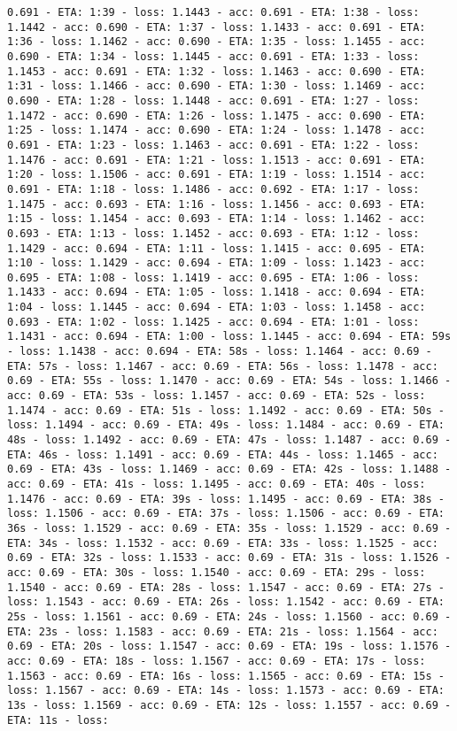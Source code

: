 \documentclass[11pt]{article}
\begin{document}
\begin{Verbatim}[commandchars=\\\{\}]
0.691 - ETA: 1:39 - loss: 1.1443 - acc: 0.691 - ETA: 1:38 - loss: 1.1442 - acc: 0.690 - ETA: 1:37 - loss: 1.1433 - acc: 0.691 - ETA: 1:36 - loss: 1.1462 - acc: 0.690 - ETA: 1:35 - loss: 1.1455 - acc: 0.690 - ETA: 1:34 - loss: 1.1445 - acc: 0.691 - ETA: 1:33 - loss: 1.1453 - acc: 0.691 - ETA: 1:32 - loss: 1.1463 - acc: 0.690 - ETA: 1:31 - loss: 1.1466 - acc: 0.690 - ETA: 1:30 - loss: 1.1469 - acc: 0.690 - ETA: 1:28 - loss: 1.1448 - acc: 0.691 - ETA: 1:27 - loss: 1.1472 - acc: 0.690 - ETA: 1:26 - loss: 1.1475 - acc: 0.690 - ETA: 1:25 - loss: 1.1474 - acc: 0.690 - ETA: 1:24 - loss: 1.1478 - acc: 0.691 - ETA: 1:23 - loss: 1.1463 - acc: 0.691 - ETA: 1:22 - loss: 1.1476 - acc: 0.691 - ETA: 1:21 - loss: 1.1513 - acc: 0.691 - ETA: 1:20 - loss: 1.1506 - acc: 0.691 - ETA: 1:19 - loss: 1.1514 - acc: 0.691 - ETA: 1:18 - loss: 1.1486 - acc: 0.692 - ETA: 1:17 - loss: 1.1475 - acc: 0.693 - ETA: 1:16 - loss: 1.1456 - acc: 0.693 - ETA: 1:15 - loss: 1.1454 - acc: 0.693 - ETA: 1:14 - loss: 1.1462 - acc: 0.693 - ETA: 1:13 - loss: 1.1452 - acc: 0.693 - ETA: 1:12 - loss: 1.1429 - acc: 0.694 - ETA: 1:11 - loss: 1.1415 - acc: 0.695 - ETA: 1:10 - loss: 1.1429 - acc: 0.694 - ETA: 1:09 - loss: 1.1423 - acc: 0.695 - ETA: 1:08 - loss: 1.1419 - acc: 0.695 - ETA: 1:06 - loss: 1.1433 - acc: 0.694 - ETA: 1:05 - loss: 1.1418 - acc: 0.694 - ETA: 1:04 - loss: 1.1445 - acc: 0.694 - ETA: 1:03 - loss: 1.1458 - acc: 0.693 - ETA: 1:02 - loss: 1.1425 - acc: 0.694 - ETA: 1:01 - loss: 1.1431 - acc: 0.694 - ETA: 1:00 - loss: 1.1445 - acc: 0.694 - ETA: 59s - loss: 1.1438 - acc: 0.694 - ETA: 58s - loss: 1.1464 - acc: 0.69 - ETA: 57s - loss: 1.1467 - acc: 0.69 - ETA: 56s - loss: 1.1478 - acc: 0.69 - ETA: 55s - loss: 1.1470 - acc: 0.69 - ETA: 54s - loss: 1.1466 - acc: 0.69 - ETA: 53s - loss: 1.1457 - acc: 0.69 - ETA: 52s - loss: 1.1474 - acc: 0.69 - ETA: 51s - loss: 1.1492 - acc: 0.69 - ETA: 50s - loss: 1.1494 - acc: 0.69 - ETA: 49s - loss: 1.1484 - acc: 0.69 - ETA: 48s - loss: 1.1492 - acc: 0.69 - ETA: 47s - loss: 1.1487 - acc: 0.69 - ETA: 46s - loss: 1.1491 - acc: 0.69 - ETA: 44s - loss: 1.1465 - acc: 0.69 - ETA: 43s - loss: 1.1469 - acc: 0.69 - ETA: 42s - loss: 1.1488 - acc: 0.69 - ETA: 41s - loss: 1.1495 - acc: 0.69 - ETA: 40s - loss: 1.1476 - acc: 0.69 - ETA: 39s - loss: 1.1495 - acc: 0.69 - ETA: 38s - loss: 1.1506 - acc: 0.69 - ETA: 37s - loss: 1.1506 - acc: 0.69 - ETA: 36s - loss: 1.1529 - acc: 0.69 - ETA: 35s - loss: 1.1529 - acc: 0.69 - ETA: 34s - loss: 1.1532 - acc: 0.69 - ETA: 33s - loss: 1.1525 - acc: 0.69 - ETA: 32s - loss: 1.1533 - acc: 0.69 - ETA: 31s - loss: 1.1526 - acc: 0.69 - ETA: 30s - loss: 1.1540 - acc: 0.69 - ETA: 29s - loss: 1.1540 - acc: 0.69 - ETA: 28s - loss: 1.1547 - acc: 0.69 - ETA: 27s - loss: 1.1543 - acc: 0.69 - ETA: 26s - loss: 1.1542 - acc: 0.69 - ETA: 25s - loss: 1.1561 - acc: 0.69 - ETA: 24s - loss: 1.1560 - acc: 0.69 - ETA: 23s - loss: 1.1583 - acc: 0.69 - ETA: 21s - loss: 1.1564 - acc: 0.69 - ETA: 20s - loss: 1.1547 - acc: 0.69 - ETA: 19s - loss: 1.1576 - acc: 0.69 - ETA: 18s - loss: 1.1567 - acc: 0.69 - ETA: 17s - loss: 1.1563 - acc: 0.69 - ETA: 16s - loss: 1.1565 - acc: 0.69 - ETA: 15s - loss: 1.1567 - acc: 0.69 - ETA: 14s - loss: 1.1573 - acc: 0.69 - ETA: 13s - loss: 1.1569 - acc: 0.69 - ETA: 12s - loss: 1.1557 - acc: 0.69 - ETA: 11s - loss: 
\end{Verbatim}
\end{document}
